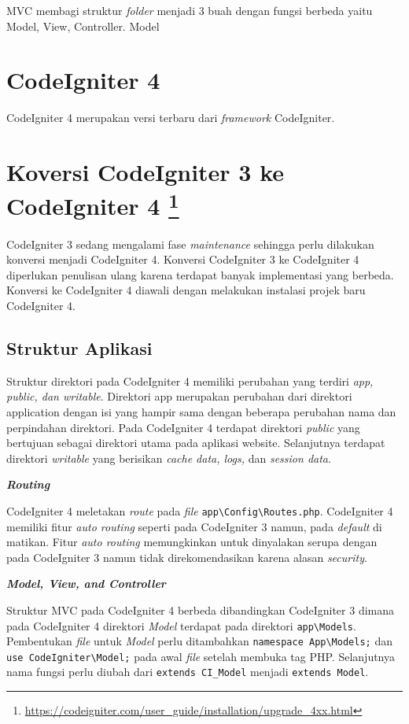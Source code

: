 MVC membagi struktur \textit{folder} menjadi 3 buah dengan fungsi berbeda yaitu Model, View, Controller. Model

\section{CodeIgniter 4}
\label{sec:ci4}

CodeIgniter 4 merupakan versi terbaru dari \textit{framework} CodeIgniter.


\section{Koversi CodeIgniter 3 ke CodeIgniter 4 \footnote{\url{https://codeigniter.com/user_guide/installation/upgrade_4xx.html}}}
\label{sec:konversici3c4}
 
CodeIgniter 3 sedang mengalami fase \textit{maintenance} sehingga perlu dilakukan konversi menjadi CodeIgniter 4. Konversi CodeIgniter 3 ke CodeIgniter 4 diperlukan penulisan ulang karena terdapat banyak implementasi yang berbeda. Konversi ke CodeIgniter 4 diawali dengan melakukan instalasi projek baru CodeIgniter 4.


\subsection{Struktur Aplikasi}

Struktur direktori pada CodeIgniter 4 memiliki perubahan yang terdiri \textit{app, public, dan writable}. Direktori app merupakan perubahan dari direktori application dengan isi yang hampir sama dengan beberapa perubahan nama dan perpindahan direktori. Pada CodeIgniter 4 terdapat direktori \textit{public} yang bertujuan sebagai direktori utama pada aplikasi website. Selanjutnya terdapat direktori \textit{writable} yang berisikan \textit{cache data, logs,} dan \textit{session data}.


\textbf{\textit{Routing}}

CodeIgniter 4 meletakan \textit{route} pada \textit{file} \verb|app\Config\Routes.php|. CodeIgniter 4 memiliki fitur \textit{auto routing} seperti pada CodeIgniter 3 namun, pada \textit{default} di matikan. Fitur \textit{auto routing} memungkinkan untuk dinyalakan serupa dengan pada CodeIgniter 3 namun tidak direkomendasikan karena alasan \textit{security}.  
 
 
\textbf{\textit{Model, View, and Controller}}
 
Struktur MVC pada CodeIgniter 4 berbeda dibandingkan CodeIgniter 3 dimana pada CodeIgniter 4 direktori \textit{Model} terdapat pada direktori \verb|app\Models|. Pembentukan \textit{file} untuk \textit{Model} perlu ditambahkan \verb|namespace App\Models;| dan \verb|use CodeIgniter\Model;| pada awal \textit{file} setelah membuka tag PHP. Selanjutnya nama fungsi perlu diubah dari \verb|extends CI_Model| menjadi \verb|extends Model|. 
 
